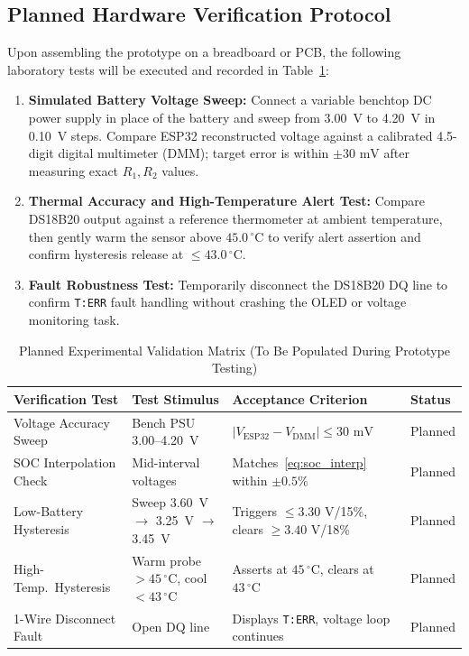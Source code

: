 \documentclass[12pt,a4paper]{article}
\begin{document}
\subsection{Planned Hardware Verification Protocol}
Upon assembling the prototype on a breadboard or PCB, the following laboratory tests will be executed and recorded in Table~\ref{tab:validation_plan}:
\begin{enumerate}
    \item \textbf{Simulated Battery Voltage Sweep:} Connect a variable benchtop DC power supply in place of the battery and sweep from 3.00~V to 4.20~V in 0.10~V steps. Compare ESP32 reconstructed voltage against a calibrated 4.5-digit digital multimeter (DMM); target error is within $\pm 30\text{ mV}$ after measuring exact $R_1, R_2$ values.
    \item \textbf{Thermal Accuracy and High-Temperature Alert Test:} Compare DS18B20 output against a reference thermometer at ambient temperature, then gently warm the sensor above $45.0\,^\circ\text{C}$ to verify alert assertion and confirm hysteresis release at $\le 43.0\,^\circ\text{C}$.
    \item \textbf{Fault Robustness Test:} Temporarily disconnect the DS18B20 DQ line to confirm \texttt{T:ERR} fault handling without crashing the OLED or voltage monitoring task.
\end{enumerate}

\begin{table}[H]
\centering


\renewcommand{\arraystretch}{1.2}
\begin{tabular}{|@{}p{3.8cm}|p{3.4cm}|p{4.0cm}|p{2.8cm}@{}|}
\hline
\textbf{Verification Test} & \textbf{Test Stimulus} & \textbf{Acceptance Criterion} & \textbf{Status} \\
\hline
Voltage Accuracy Sweep & Bench PSU 3.00--4.20~V & $|V_{\text{ESP32}} - V_{\text{DMM}}| \le 30\text{ mV}$ & Planned \\\hline
SOC Interpolation Check & Mid-interval voltages & Matches~\eqref{eq:soc_interp} within $\pm 0.5\%$ & Planned \\\hline
Low-Battery Hysteresis & Sweep 3.60~V $\to$ 3.25~V $\to$ 3.45~V & Triggers $\le 3.30\text{ V}$/15\%, clears $\ge 3.40\text{ V}$/18\% & Planned \\\hline
High-Temp.\ Hysteresis & Warm probe $> 45\,^\circ\text{C}$, cool $< 43\,^\circ\text{C}$ & Asserts at $45\,^\circ\text{C}$, clears at $43\,^\circ\text{C}$ & Planned \\\hline
1-Wire Disconnect Fault & Open DQ line & Displays \texttt{T:ERR}, voltage loop continues & Planned \\
\hline
\end{tabular}
\caption{Planned Experimental Validation Matrix (To Be Populated During Prototype Testing)}
\label{tab:validation_plan}
\end{table}
\end{document}
